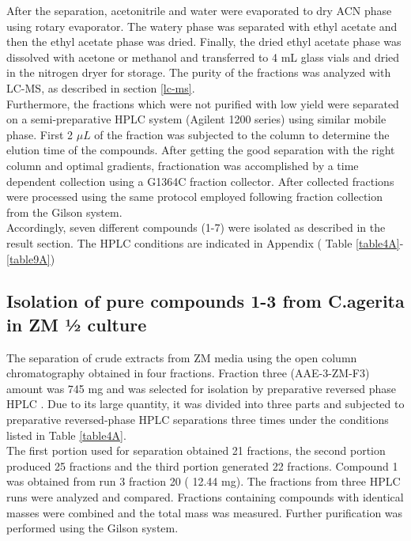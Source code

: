 After the separation, acetonitrile and water were evaporated to dry ACN phase using rotary evaporator. The watery phase was separated with ethyl acetate and then the ethyl acetate phase was dried. Finally, the dried ethyl acetate phase was dissolved with acetone or methanol and  transferred to 4 mL glass vials and dried in the nitrogen dryer for storage. The purity of the fractions was analyzed with LC-MS, as described in section \ref{lc-ms}.\\

Furthermore, the fractions which were not purified with low yield were separated on a semi-preparative HPLC system (Agilent 1200 series) using similar mobile phase. First 2 $\mu L$ of the fraction was subjected to the column to determine the elution time of the compounds. After getting the good separation with the right column and optimal gradients, fractionation was accomplished by a time dependent collection using a G1364C fraction collector. After collected fractions  were processed using the same protocol employed following fraction collection from the Gilson system.\\

Accordingly, seven different compounds (1-7) were isolated as described in the result section. The HPLC conditions are indicated in Appendix ( Table \ref{table4A}-\ref{table9A})



\subsection{Isolation of pure compounds 1-3 from C.agerita in ZM ½ culture}
The separation of crude extracts from ZM media using the open column chromatography obtained in four fractions. Fraction three (AAE-3-ZM-F3) amount was 745 mg and was selected  for isolation by preparative reversed phase HPLC . Due to its large quantity, it was divided into three parts and subjected to preparative reversed-phase HPLC separations three times under the conditions listed in Table \ref{table4A}.\\

The first portion used for separation obtained 21 fractions, the second portion produced  25 fractions and the third portion generated 22 fractions. Compound 1 was obtained from run 3 fraction 20 ( 12.44 mg). The fractions from three HPLC runs were analyzed and compared. Fractions  containing compounds with identical masses were combined and the total mass was measured. Further purification was performed using the Gilson system.\\

